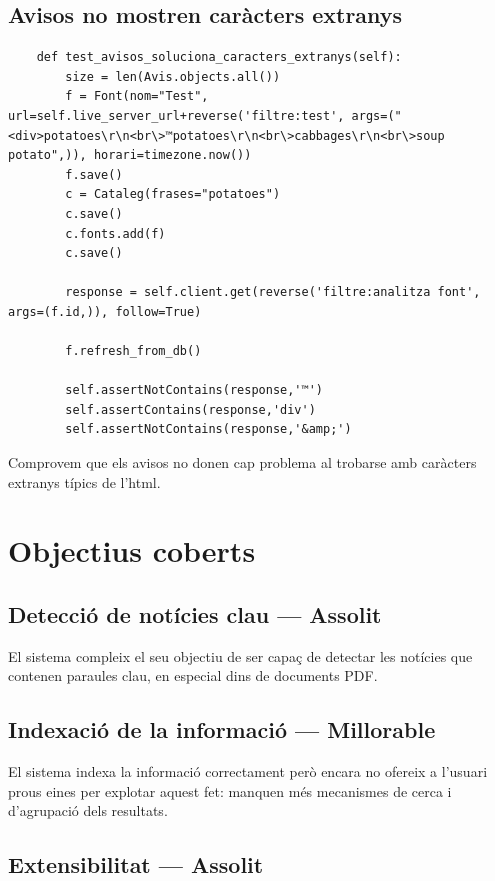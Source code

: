 \documentclass{article}
\begin{document}
\subsection{Avisos no mostren caràcters extranys}

\begin{lstlisting}
    def test_avisos_soluciona_caracters_extranys(self):
        size = len(Avis.objects.all())
        f = Font(nom="Test", url=self.live_server_url+reverse('filtre:test', args=("<div>potatoes\r\n<br\>™potatoes\r\n<br\>cabbages\r\n<br\>soup potato",)), horari=timezone.now())
        f.save()
        c = Cataleg(frases="potatoes")
        c.save()
        c.fonts.add(f)
        c.save()

        response = self.client.get(reverse('filtre:analitza font', args=(f.id,)), follow=True)

        f.refresh_from_db()

        self.assertNotContains(response,'™')
        self.assertContains(response,'div')
        self.assertNotContains(response,'&amp;')
\end{lstlisting}

Comprovem que els avisos no donen cap problema al trobarse amb caràcters extranys típics de l'html.

\newpage

\section{Objectius coberts}

\subsection{Detecció de notícies clau --- Assolit}

El sistema compleix el seu objectiu de ser capaç de detectar les notícies que contenen paraules clau, en especial dins de documents PDF\@.


\subsection{Indexació de la informació --- Millorable}

El sistema indexa la informació correctament però encara no ofereix a l'usuari prous eines per explotar aquest fet: manquen més mecanismes de cerca i d'agrupació dels resultats.


\subsection{Extensibilitat --- Assolit}
\end{document}
